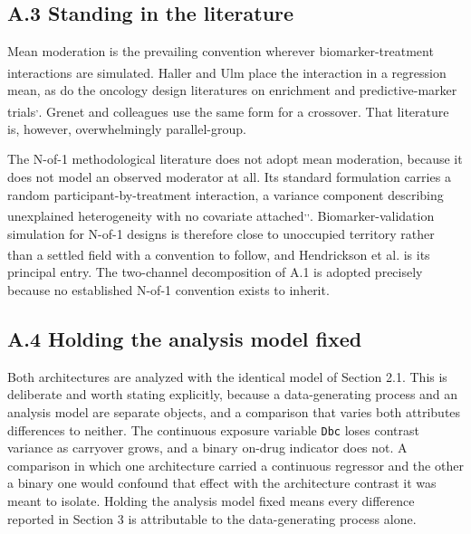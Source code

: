 \documentclass[
  11pt,
]{article}
\begin{document}
\subsection{A.3 Standing in the literature}

Mean moderation is the prevailing convention wherever
biomarker-treatment interactions are simulated. Haller and Ulm\textsuperscript{} place the interaction in a regression mean, as do the
oncology design literatures on enrichment and predictive-marker
trials\textsuperscript{,}. Grenet and colleagues\textsuperscript{} use the same form for a crossover. That literature is,
however, overwhelmingly parallel-group.

The N-of-1 methodological literature does not adopt mean moderation,
because it does not model an observed moderator at all. Its standard
formulation carries a random participant-by-treatment interaction, a
variance component describing unexplained heterogeneity with no
covariate attached\textsuperscript{,,}. Biomarker-validation simulation for N-of-1 designs is
therefore close to unoccupied territory rather than a settled field
with a convention to follow, and Hendrickson et al.\textsuperscript{} is its principal entry. The two-channel
decomposition of A.1 is adopted precisely because no established
N-of-1 convention exists to inherit.

\subsection{A.4 Holding the analysis model fixed}

Both architectures are analyzed with the identical model of Section
2.1. This is deliberate and worth stating explicitly, because a
data-generating process and an analysis model are separate objects,
and a comparison that varies both attributes differences to neither.
The continuous exposure variable \texttt{Dbc} loses contrast variance
as carryover grows, and a binary on-drug indicator does not. A
comparison in which one architecture carried a continuous regressor
and the other a binary one would confound that effect with the
architecture contrast it was meant to isolate. Holding the analysis
model fixed means every difference reported in Section 3 is
attributable to the data-generating process alone.
\end{document}
